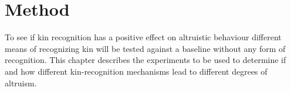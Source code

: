 \documentclass[a4paper]{book}
\begin{document}



\chapter{Method}
\label{cha:model}

To see if kin recognition has a positive effect on altruistic behaviour different means of recognizing kin will be tested against a baseline without any form of recognition. 
This chapter describes the experiments to be used to determine if and how different kin-recognition mechanisms lead to different degrees of altruism.
\end{document}
